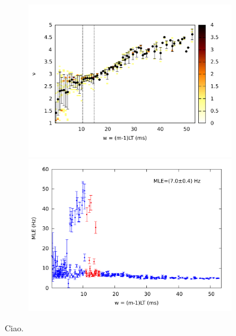 \documentclass[a4paper,11pt,aps,secnumarabic,balancelastpage,amsmath,amssymb,floatfix,table]{article}
\begin{document}
\begin{figure}[H]
\begin{minipage}{.49\textwidth}
\begin{subfigure}{\linewidth}
            \centering
            \includegraphics[width=\linewidth]
            {../5_blocks/4e4_points/plots/joint.pdf}\\
            \includegraphics[width=\linewidth]
            {../5_blocks/4e4_points/plots/mle.pdf}
        \end{subfigure}
    \end{minipage}
    \caption{Ciao.}
    \label{fig:5 blocks chaos}
\end{figure}


\clearpage

\printbibliography
\end{document}
